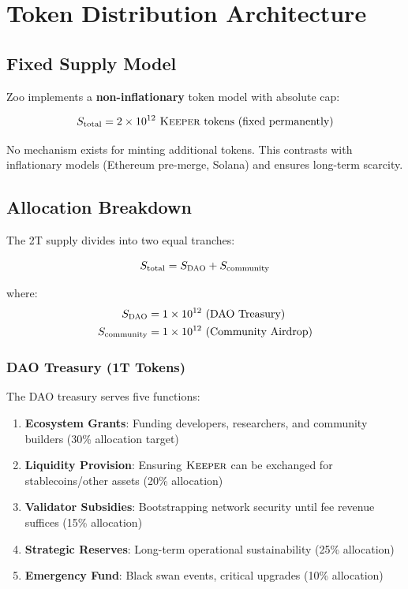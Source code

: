 \section{Token Distribution Architecture}


\subsection{Fixed Supply Model}

Zoo implements a \textbf{non-inflationary} token model with absolute cap:

\begin{equation}
S_{\text{total}} = 2 \times 10^{12} \text{ } \textsc{Keeper} \text{ tokens (fixed permanently)}
\end{equation}

No mechanism exists for minting additional tokens. This contrasts with inflationary models (Ethereum pre-merge, Solana) and ensures long-term scarcity.

\subsection{Allocation Breakdown}

The 2T supply divides into two equal tranches:

\begin{equation}
S_{\text{total}} = S_{\textsc{DAO}} + S_{\text{community}}
\end{equation}

where:
\begin{align}
S_{\textsc{DAO}} &= 1 \times 10^{12} \text{ (DAO Treasury)} \\
S_{\text{community}} &= 1 \times 10^{12} \text{ (Community Airdrop)}
\end{align}

\subsubsection{DAO Treasury (1T Tokens)}

The DAO treasury serves five functions:

\begin{enumerate}
\item \textbf{Ecosystem Grants}: Funding developers, researchers, and community builders (30\% allocation target)
\item \textbf{Liquidity Provision}: Ensuring $\textsc{Keeper}$ can be exchanged for stablecoins/other assets (20\% allocation)
\item \textbf{Validator Subsidies}: Bootstrapping network security until fee revenue suffices (15\% allocation)
\item \textbf{Strategic Reserves}: Long-term operational sustainability (25\% allocation)
\item \textbf{Emergency Fund}: Black swan events, critical upgrades (10\% allocation)
\end{enumerate}

